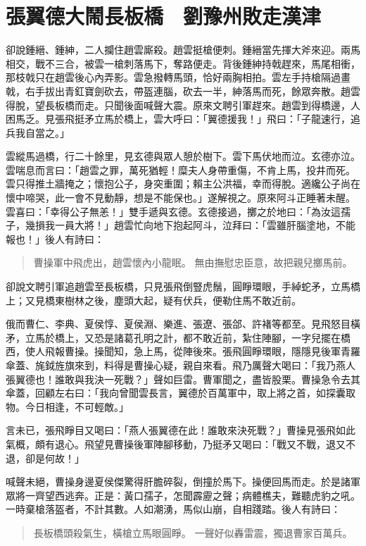 
\chapter{張翼德大鬧長板橋　劉豫州敗走漢津}

卻說鍾縉、鍾紳，二人攔住趙雲廝殺。趙雲挺槍便刺。鍾縉當先揮大斧來迎。兩馬相交，戰不三合，被雲一槍刺落馬下，奪路便走。背後鍾紳持戟趕來，馬尾相衝，那枝戟只在趙雲後心內弄影。雲急撥轉馬頭，恰好兩胸相拍。雲左手持槍隔過畫戟，右手拔出青釭寶劍砍去，帶盔連腦，砍去一半，紳落馬而死，餘眾奔散。趙雲得脫，望長板橋而走。只聞後面喊聲大震。原來文聘引軍趕來。趙雲到得橋邊，人困馬乏。見張飛挺矛立馬於橋上，雲大呼曰：「翼德援我！」飛曰：「子龍速行，追兵我自當之。」

雲縱馬過橋，行二十餘里，見玄德與眾人憩於樹下。雲下馬伏地而泣。玄德亦泣。雲喘息而言曰：「趙雲之罪，萬死猶輕！糜夫人身帶重傷，不肯上馬，投井而死。雲只得推土牆掩之；懷抱公子，身突重圍；賴主公洪福，幸而得脫。適纔公子尚在懷中啼哭，此一會不見動靜，想是不能保也。」遂解視之。原來阿斗正睡著未醒。雲喜曰：「幸得公子無恙！」雙手遞與玄德。玄德接過，擲之於地曰：「為汝這孺子，幾損我一員大將！」趙雲忙向地下抱起阿斗，泣拜曰：「雲雖肝腦塗地，不能報也！」後人有詩曰：

\begin{quote}
曹操軍中飛虎出，趙雲懷內小龍眠。
無由撫慰忠臣意，故把親兒擲馬前。
\end{quote}

卻說文聘引軍追趙雲至長板橋，只見張飛倒豎虎鬚，圓睜環眼，手綽蛇矛，立馬橋上；又見橋東樹林之後，塵頭大起，疑有伏兵，便勒住馬不敢近前。

俄而曹仁、李典、夏侯惇、夏侯淵、樂進、張遼、張郃、許褚等都至。見飛怒目橫矛，立馬於橋上，又恐是諸葛孔明之計，都不敢近前，紮住陣腳，一字兒擺在橋西，使人飛報曹操。操聞知，急上馬，從陣後來。張飛圓睜環眼，隱隱見後軍青羅傘蓋、旄鉞旌旗來到，料得是曹操心疑，親自來看。飛乃厲聲大喝曰：「我乃燕人張翼德也！誰敢與我決一死戰？」聲如巨雷。曹軍聞之，盡皆股栗。曹操急令去其傘蓋，回顧左右曰：「我向曾聞雲長言，翼德於百萬軍中，取上將之首，如探囊取物。今日相逢，不可輕敵。」

言未已，張飛睜目又喝曰：「燕人張翼德在此！誰敢來決死戰？」曹操見張飛如此氣概，頗有退心。飛望見曹操後軍陣腳移動，乃挺矛又喝曰：「戰又不戰，退又不退，卻是何故！」

喊聲未絕，曹操身邊夏侯傑驚得肝膽碎裂，倒撞於馬下。操便回馬而走。於是諸軍眾將一齊望西逃奔。正是：黃口孺子，怎聞霹靂之聲；病體樵夫，難聽虎豹之吼。一時棄槍落盔者，不計其數。人如潮湧，馬似山崩，自相踐踏。後人有詩曰：

\begin{quote}
長板橋頭殺氣生，橫槍立馬眼圓睜。
一聲好似轟雷震，獨退曹家百萬兵。
\end{quote}

